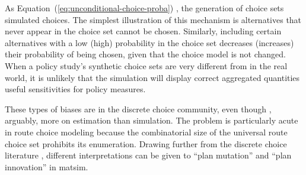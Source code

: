 % 
%

As Equation~(\ref{eq:unconditional-choice-proba}) , the generation of  choice sets  simulated choices.
The simplest illustration of this mechanism is alternatives that
never appear in the choice set cannot be chosen.
Similarly, including certain alternatives with a low (high) probability in the
choice set decreases (increases) their probability of being chosen, given that
the choice model is not changed. When a policy study's synthetic choice sets are
very different from  in the
real world, it is unlikely that the simulation will display correct aggregated
quantities 
useful sensitivities for policy measures.

These types of biases are  in the discrete
choice community, even though ,
arguably, more on estimation than simulation.
The problem is particularly acute in route choice modeling\corr{,}{} because the
combinatorial size of the universal route choice set prohibits its enumeration.
Drawing further from the discrete choice literature \citep[specifically][]{frejinger-2010}, 
different interpretations can be given to ``plan mutation'' and ``plan
innovation'' in \gls{matsim}. 
%
%

